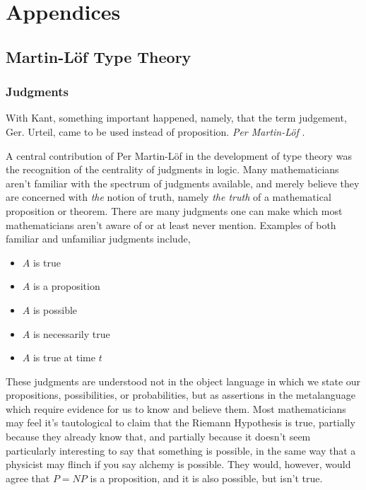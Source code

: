 \section{Appendices} \label{appendix}
\subsection{Martin-Löf Type Theory} \label{judge}
\subsubsection{Judgments}

\begin{displayquote}
With Kant, something important happened, namely, that the term judgement, Ger.
Urteil, came to be used instead of proposition. \emph{Per Martin-Löf} \cite{mlMeanings}.
\end{displayquote}

A central contribution of Per Martin-Löf in the development of type theory was
the recognition of the centrality of judgments in logic. Many mathematicians
aren't familiar with the spectrum of judgments available, and merely believe
they are concerned with \emph{the} notion of truth, namely \emph{the truth} of a
mathematical proposition or theorem. There are many judgments one can make which
most mathematicians aren't aware of or at least never mention. Examples of both familiar
and unfamiliar judgments include,

\begin{itemize}

\item $A$ is true
\item $A$ is a proposition
\item $A$ is possible
\item $A$ is necessarily true
\item $A$ is true at time $t$

\end{itemize}

These judgments are understood not in the object language in which we state our
propositions, possibilities, or probabilities, but as assertions in the
metalanguage which require evidence for us to know and believe them. Most
mathematicians may feel it's tautological to claim that the Riemann Hypothesis is
true, partially because they already know that, and partially because it doesn't
seem particularly interesting to say that something is possible, in the same way
that a physicist may flinch if you say alchemy is possible. They would, however,
would agree that $P = NP$ is a proposition, and it is also possible, but isn't
true.

